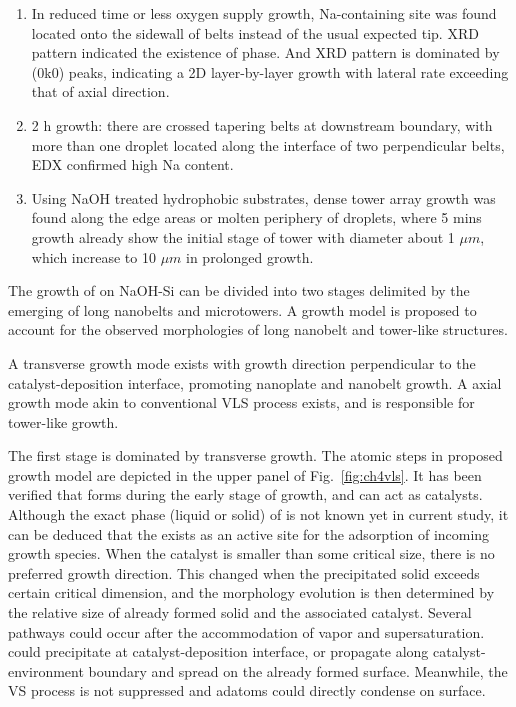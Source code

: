 \begin{enumerate}
\item In reduced time or less oxygen supply growth, Na-containing site was found located onto the sidewall of belts instead of the usual expected tip. XRD pattern indicated the existence of  phase. And  XRD pattern is dominated by (0k0) peaks, indicating a 2D layer-by-layer growth with lateral rate exceeding that of axial direction.
\item 2 h growth: there are crossed tapering belts at downstream boundary, with more than one droplet located along the interface of two perpendicular belts, EDX confirmed high Na content.
\item Using NaOH treated hydrophobic substrates, dense tower array growth was found along the edge areas or molten periphery of droplets, where 5 mins growth already show the initial stage of tower with diameter about 1 $\mu m$, which increase to 10 $\mu m$ in prolonged growth.
\end{enumerate}


The growth of  on NaOH-Si can be divided into two stages delimited by the emerging of long nanobelts and microtowers. A growth model is proposed to account for the observed morphologies of  long nanobelt and tower-like structures. 
\begin{hypothesis}\label{hypo2}
A transverse growth mode exists with growth direction perpendicular to the catalyst-deposition interface, promoting  nanoplate and nanobelt growth. A axial growth mode akin to conventional VLS process exists, and is responsible for  tower-like growth.  
\end{hypothesis}

The first stage is dominated by transverse growth. The atomic steps in proposed growth model are depicted in the upper panel of Fig.~\ref{fig:ch4vls}. It has been verified that  forms during the early stage of growth, and can act as catalysts. Although the exact phase (liquid or solid) of  is not known yet in current study, it can be deduced that the  exists as an active site for the adsorption of incoming  growth species. When the catalyst is smaller than some critical size, there is no preferred growth direction. This changed when the precipitated solid exceeds certain critical dimension, and the morphology evolution is then determined by the relative size of already formed solid and the associated catalyst. Several pathways could occur after the accommodation of  vapor and supersaturation.  could precipitate at catalyst-deposition interface, or propagate along catalyst-environment boundary and spread on the already formed  surface. Meanwhile, the VS process is not suppressed and  adatoms could directly condense on  surface.

